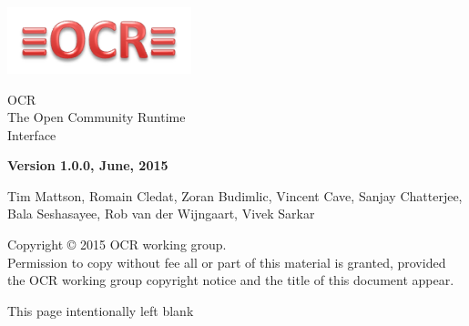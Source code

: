 
\begin{titlepage}
  \begin{flushleft}
    \hspace{-6em} \includegraphics[width=0.4\textwidth]{ocr-logo.png}
  \end{flushleft}

  \begin{adjustwidth}{-0.75in}{0in}
    \begin{center}
      \Huge
      \textsf{OCR\\The Open Community Runtime \\Interface}

      \vspace{0.5in}\textsf{ }\vspace{-0.7in}
      \normalsize
      \vspace{1.0in}
      \textbf{Version 1.0.0, June, 2015}
      \vspace{1.0in}

Tim Mattson, Romain Cledat, Zoran Budimlic,
Vincent Cave, Sanjay Chatterjee,  Bala Seshasayee, Rob van der Wijngaart,
Vivek Sarkar
    \end{center}
  \end{adjustwidth}
  \vspace{2.0in}

  \begin{adjustwidth}{0pt}{1em}\setlength{\parskip}{0.25\baselineskip}%
Copyright © 2015 OCR working group.\\
Permission to copy without fee all or part of this material is granted,
provided the OCR working group copyright notice and
the title of this document appear.
  \end{adjustwidth}
\end{titlepage}


\clearpage
\thispagestyle{empty}
\phantom{a}
This page intentionally left blank
\vfill